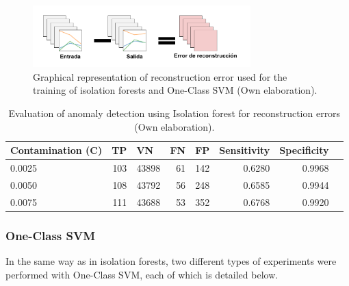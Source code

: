 \begin{itemize}
\begin{figure}[H]
        \centering
            \includegraphics[width=0.75\textwidth, frame]{imagenes/Cap5/error}
        \caption{Graphical representation of reconstruction error used for the training of isolation forests and One-Class SVM (Own elaboration).}
		\label{fig:error}
\end{figure}

\begin{table}[H]
\centering
\begin{center}
\begin{tabular}{|l|r|r|r|r|r|r|r|}
\hline
\textbf{Contamination (C)} & \multicolumn{1}{l|}{\textbf{TP}} & \multicolumn{1}{l|}{\textbf{VN}}& \multicolumn{1}{l|}{\textbf{FN}}& \multicolumn{1}{l|}{\textbf{FP}} & \multicolumn{1}{l|}{\textbf{Sensitivity}} & \multicolumn{1}{l|}{\textbf{Specificity}} \\ \hline
0.0025 & \cellcolor[HTML]{AADD99} 103 & \cellcolor[HTML]{AADD99} 43898 & \cellcolor[HTML]{FFCE93} 61 & \cellcolor[HTML]{FFCE93} 142 & 0.6280 & 0.9968 \\ \hline
0.0050 & \cellcolor[HTML]{AADD99} 108 & \cellcolor[HTML]{AADD99} 43792 & \cellcolor[HTML]{FFCE93} 56 & \cellcolor[HTML]{FFCE93} 248 & 0.6585 & 0.9944 \\ \hline
0.0075 & \cellcolor[HTML]{AADD99} 111 & \cellcolor[HTML]{AADD99} 43688 & \cellcolor[HTML]{FFCE93} 53 & \cellcolor[HTML]{FFCE93} 352 & 0.6768 & 0.9920 \\ \hline
\end{tabular}
\end{center}
\caption{Evaluation of anomaly detection using Isolation forest for reconstruction errors (Own elaboration).}
\label{table:evaluacion_IF_errores_reconstruccion}
\end{table}
\end{itemize}

\subsubsection{One-Class SVM}

In the same way as in isolation forests, two different types of experiments were performed with One-Class SVM, each of which is detailed below.

